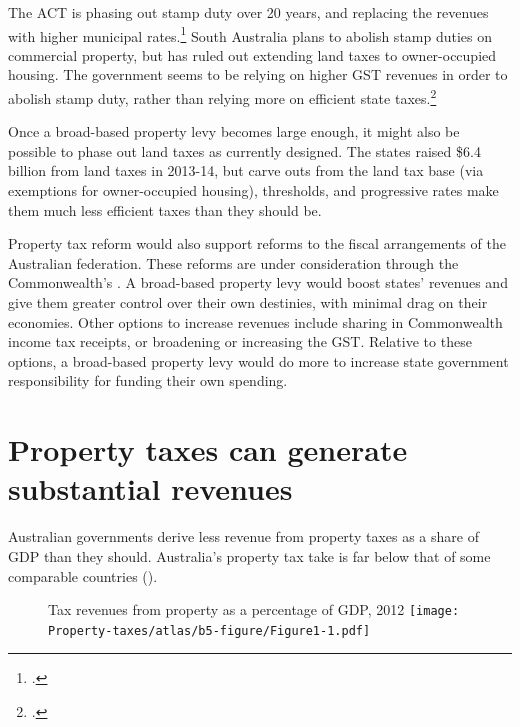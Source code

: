 \documentclass[twoside,english]{palatinob5ona4portrait}
\begin{document}
The ACT is phasing out stamp duty over 20 years, and replacing the revenues with higher municipal rates.\footcites[][21]{ACT-Treasury2012-13-Budget-Papers}[][229]{ACT-Treasury2014-15-Budget-Papers}  South Australia plans to abolish stamp duties on commercial property, but has ruled out extending land taxes to owner-occupied housing. The government seems to be relying on higher GST revenues in order to abolish stamp duty, rather than relying more on efficient state taxes.\footcites{GovernmentSouthAustralia2015-Govt-response-to-State-Tax-Review}{DTF2015-State-Budget-Papers-201516} 

Once a broad-based property levy becomes large enough, it might also be possible to phase out land taxes as currently designed. The states raised \$6.4 billion from land taxes in 2013-14, but carve outs from the land tax base (via exemptions for owner-occupied housing), thresholds, and progressive rates make them much less efficient taxes than they should be. 

Property tax reform would also support reforms to the fiscal arrangements of the Australian federation. These reforms are under consideration through the Commonwealth’s 
.
A broad-based property levy would boost states’ revenues and give them greater control over their own destinies, with minimal drag on their economies. Other options to increase revenues include sharing in Commonwealth income tax receipts, or broadening or increasing the GST\@. Relative to these options, a broad-based property levy would do more to increase state government responsibility for funding their own spending. 


\chapter{Property taxes can generate substantial revenues}\label{chapter:PROP-3}
Australian governments derive less revenue from property taxes as a share of GDP than they should. Australia’s property tax take is far below that of some comparable countries ().

\begin{figure}
%
{Tax revenues from property as a percentage of GDP, 2012}
\texttt{[image: Property-taxes/atlas/b5-figure/Figure1-1.pdf]}

\end{figure}
\end{document}
